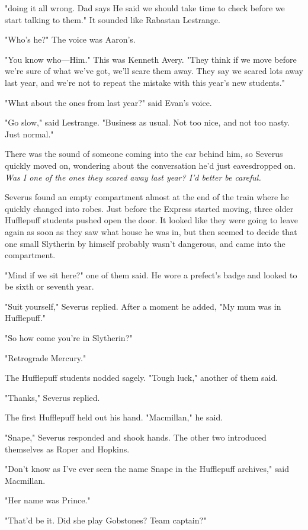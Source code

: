 "{\el}doing it all wrong. Dad says He said we should take time to check before we start talking to them." It sounded like Rabastan Lestrange.

"Who's he?" The voice was Aaron's.

"You know who—Him." This was Kenneth Avery. "They think if we move before we're sure of what we've got, we'll scare them away. They say we scared lots away last year, and we're not to repeat the mistake with this year's new students."

"What about the ones from last year?" said Evan's voice.

"Go slow," said Lestrange. "Business as usual. Not too nice, and not too nasty. Just normal."

There was the sound of someone coming into the car behind him, so Severus quickly moved on, wondering about the conversation he'd just eavesdropped on. \emph{Was I one of the ones they scared away last year? I'd better be careful.}

Severus found an empty compartment almost at the end of the train where he quickly changed into robes. Just before the Express started moving, three older Hufflepuff students pushed open the door. It looked like they were going to leave again as soon as they saw what house he was in, but then seemed to decide that one small Slytherin by himself probably wasn't dangerous, and came into the compartment.

"Mind if we sit here?" one of them said. He wore a prefect's badge and looked to be sixth or seventh year.

"Suit yourself," Severus replied. After a moment he added, "My mum was in Hufflepuff."

"So how come you're in Slytherin?"

"Retrograde Mercury."

The Hufflepuff students nodded sagely. "Tough luck," another of them said.

"Thanks," Severus replied.

The first Hufflepuff held out his hand. "Macmillan," he said.

"Snape," Severus responded and shook hands. The other two introduced themselves as Roper and Hopkins.

"Don't know as I've ever seen the name Snape in the Hufflepuff archives," said Macmillan.

"Her name was Prince."

"That'd be it. Did she play Gobstones? Team captain?"

